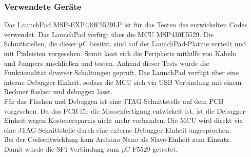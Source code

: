 \subsubsection{Verwendete Geräte}
Das LaunchPad MSP-EXP430F5529LP ist für das Testen des entwickelten Codes verwendet. Das LaunchPad verfügt über die MCU MSP430F5529. Die Schnittstellen, die dieser µC besitzt, sind auf der LaunchPad-Platine verteilt und mit Pinleisten vorgesehen. Somit lässt sich die Peripherie mithilfe von Kabeln und Jumpers anschließen und testen. Anhand dieser Tests wurde die Funktionalität diverser Schaltungen geprüft. Das LaunchPad verfügt über eine interne Debugger-Einheit, sodass die MCU sich via USB Verbindung mit einem Rechner  flashen und debuggen lässt.\\
Für das Flashen und Debuggen ist eine JTAG-Schnittstelle auf dem PCB vorgesehen. Da das PCB für die Massenfertigung entwickelt ist, ist die Debugger-Einheit wegen Kostenersparnis nicht mehr vorhanden. Die MCU wird direkt via eine JTAG-Schnittstelle durch eine externe Debugger-Einheit angesprochen.\\
Bei der Codeentwicklung kam Arduino Nano als Slave-Einheit zum Einsatz. Damit wurde die SPI Verbindung zum µC F5529 getestet.